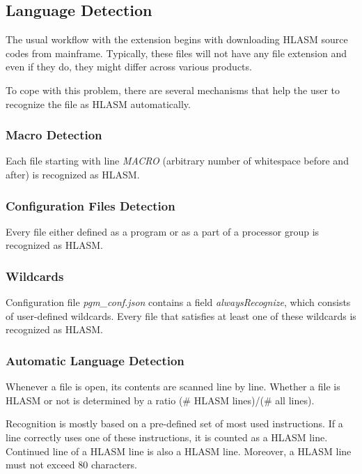 \subsection{Language Detection}

The usual workflow with the extension begins with downloading HLASM source codes from mainframe. Typically, these files will not have any file extension and even if they do, they might differ across various products.

To cope with this problem, there are several mechanisms that help the user to recognize the file as HLASM automatically.

\subsubsection{Macro Detection}

Each file starting with line \emph{MACRO} (arbitrary number of whitespace before and after) is recognized as HLASM.

\subsubsection{Configuration Files Detection}

Every file either defined as a program or as a part of a processor group is recognized as HLASM.

\subsubsection{Wildcards}

Configuration file \emph{pgm\_conf.json} contains a field \emph{alwaysRecognize}, which consists of user-defined wildcards. Every file that satisfies at least one of these wildcards is recognized as HLASM.

\subsubsection{Automatic Language Detection}

Whenever a file is open, its contents are scanned line by line. Whether a file is HLASM or not is determined by a ratio (\# HLASM lines)/(\# all lines).

Recognition is mostly based on a pre-defined set of most used instructions. If a line correctly uses one of these instructions, it is counted as a HLASM line. Continued line of a HLASM line is also a HLASM line.
Moreover, a HLASM line must not exceed 80 characters.

